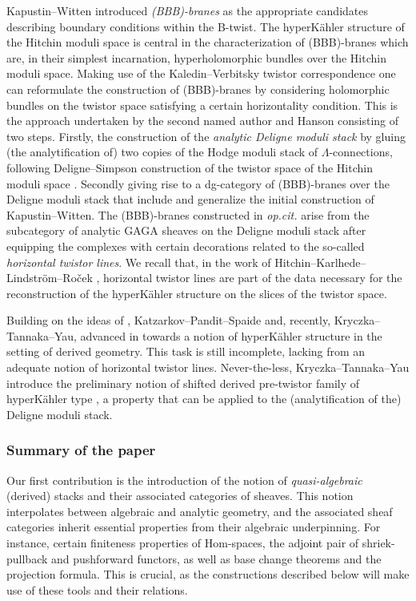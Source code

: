 \documentclass[11pt, a4paper]{amsart}
\numberwithin{equation}{section}
\theoremstyle{definition}
\theoremstyle{remark}
\begin{document}
Kapustin--Witten \cite{kapustin&witten} introduced {\it (BBB)-branes} as the appropriate candidates describing boundary conditions within the B-twist. The hyperK\"ahler structure of the Hitchin moduli space is central in the characterization of (BBB)-branes which are, in their simplest incarnation, hyperholomorphic bundles over the Hitchin moduli space. Making use of the Kaledin--Verbitsky twistor correspondence \cite{kaledin&verbitsky} one can reformulate the construction of (BBB)-branes by considering holomorphic bundles on the twistor space satisfying a certain horizontality condition. This is the approach undertaken by the second named author and Hanson \cite{franco&hanson, hanson_1, hanson_2} consisting of two steps. Firstly, the construction of the {\it analytic Deligne moduli stack} by gluing (the analytification of) two copies of the Hodge moduli stack of $\Lambda$-connections, following Deligne--Simpson construction of the twistor space of the Hitchin moduli space \cite{simpson_hodge_2}. Secondly giving rise to a dg-category of (BBB)-branes over the Deligne moduli stack that include and generalize the initial construction of Kapustin--Witten. The (BBB)-branes constructed in {\it op.cit.} arise from the subcategory of analytic GAGA sheaves on the Deligne moduli stack after equipping the complexes with certain decorations related to the so-called {\it horizontal twistor lines}. We recall that, in the work of Hitchin--Karlhede--Lindstr\"om--Ro\v{c}ek \cite{HKLR}, horizontal twistor lines are part of the data necessary for the reconstruction of the hyperK\"ahler structure on the slices of the twistor space.

Building on the ideas of \cite{HKLR}, Katzarkov--Pandit--Spaide and, recently, Kryczka--Tannaka--Yau, advanced in \cite{KPS, kryczka&tannaka&yau} towards a notion of hyperK\"ahler structure in the setting of derived geometry. This task is still incomplete, lacking from an adequate notion of horizontal twistor lines. Never-the-less, Kryczka--Tannaka--Yau introduce the preliminary notion of shifted derived pre-twistor family of hyperKähler type \cite{kryczka&tannaka&yau}, a property that can be applied to the (analytification of the) Deligne moduli stack.

\subsubsection*{Summary of the paper}

Our first contribution is the introduction of the notion of {\it quasi-algebraic} (derived) stacks and their associated categories of sheaves. This notion interpolates between algebraic and analytic geometry, and the associated sheaf categories inherit essential properties from their algebraic underpinning. For instance, certain finiteness properties of Hom-spaces, the adjoint pair of shriek-pullback and pushforward functors, as well as base change theorems and the projection formula. This is crucial, as the constructions described below will make use of these tools and their relations.   
\end{document}

